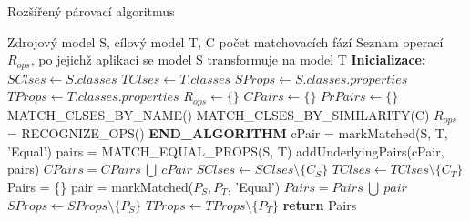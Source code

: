 \documentclass[11pt,twoside,a4paper]{book}
\begin{document}
\begin{algorithm}
 \caption{Rozšířený párovací
 algoritmus}\label{algo:matching_ext}

\begin{algorithmic}[1]
   \Require Zdrojový model S, cílový model T, C počet matchovacích fází
   \Ensure Seznam operací $R_{ops}$, po jejichž aplikaci se model S transformuje
       na model T
   \Statex
   \State \textbf{Inicializace:}
   \State $SClses \gets S.classes$  
   \State $TClses \gets T.classes$ 
   \State $SProps \gets S.classes.properties$ 
   \State $TProps \gets T.classes.properties$ 
   \State $R_{ops} \gets \{\}$
   \State $CPairs \gets \{\}$
   \State $PrPairs \gets \{\}$
   \Statex	   
   \State MATCH\_CLSES\_BY\_NAME()
   \State MATCH\_CLSES\_BY\_SIMILARITY(C)
   \State $R_{ops}$= RECOGNIZE\_OPS()
   \State \textbf{END\_ALGORITHM}
   \Statex
    \label{algo:matching:forEqualCls}
   	        \State cPair = markMatched(S, T, 'Equal') 
   	        \label{algo:matching_ext:make_pair} 
   	        \State  pairs = MATCH\_EQUAL\_PROPS(S, T)
   	        \State  addUnderlyingPairs(cPair, pairs)
   	        \State  $CPairs = CPairs\ \bigcup \ cPair$
   	        \State $SClses \gets SClses \setminus \{ C_S\}$
   	        \State $TClses \gets TClses \setminus \{ C_T\}$   	        
   	     \EndIf
      \EndFor
   \EndFor
  \EndProcedure	      
   \Statex	
   \label{algo:matching_ext:match_equal_props} \State Pairs = \{\}
   	           \State pair = markMatched($P_S, P_T$, 'Equal')
   	           \State $Pairs = Pairs\ \bigcup\ pair$  
   	           \State $SProps \gets SProps \setminus \{
   	           P_S\}$ 
   	           \State $TProps \gets TProps \setminus \{ P_T\}$
   	        \EndIf
   	      \EndFor
   	   \EndFor
   	   \State \textbf{return } Pairs
   \EndProcedure  
\end{algorithmic}
\end{algorithm}
\end{document}
